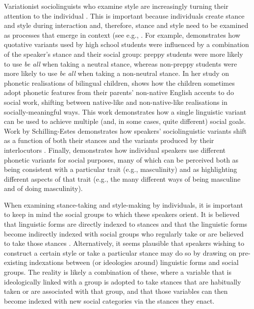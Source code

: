 \noindent Variationist sociolinguists who examine style are increasingly turning their attention to the individual \citep{eckert1996,eckert2011,podesva2011}.  This is important because individuals create stance and style during interaction and, therefore, stance and style need to be examined as processes that emerge in context (see e.g., \citet{coupland2007,kiesling2009,rampton2013}. For example, \citet[110--115]{bucholtz2010} demonstrates how quotative variants used by high school students were influenced by a combination of the speaker's stance and their social group: preppy students were more likely to use \textit{be all} when taking a neutral stance, whereas non-preppy students were more likely to use \textit{be all} when taking a non-neutral stance.  In her study on phonetic realisations of bilingual children, \citet{khattab2013} shows how the children sometimes adopt phonetic features from their parents' non-native English accents to do social work, shifting between native-like and non-native-like realisations in socially-meaningful ways.  This work demonstrates how a single linguistic variant can be used to achieve multiple (and, in some cases, quite different) social goals. Work by Schilling-Estes demonstrates how speakers' sociolinguistic variants shift as a function of both their stances and the variants produced by their interlocutors \citep{schillingestes2004}. Finally, \citet{kirtley-diss} demonstrates how individual speakers use different phonetic variants for social purposes, many of which can be perceived both as being consistent with a particular trait (e.g., masculinity) and as highlighting different aspects of that trait (e.g., the many different ways of being masculine and of doing masculinity).  

When examining stance-taking and style-making by individuals, it is important to keep in mind the social groups to which these speakers orient.  It is believed that linguistic forms are directly indexed to stances and that the linguistic forms become indirectly indexed with social groups who regularly take or are believed to take those stances \citep{bucholtz2009,dubois2007}. Alternatively, it seems plausible that speakers wishing to construct a certain style or take a particular stance may do so by drawing on pre-existing indexations between (or ideologies around) linguistic forms and social groups.  The reality is likely a combination of these, where a variable that is ideologically linked with a group is adopted to take stances that are habitually taken or are associated with that group, and that those variables can then become indexed with new social categories via the stances they enact.

